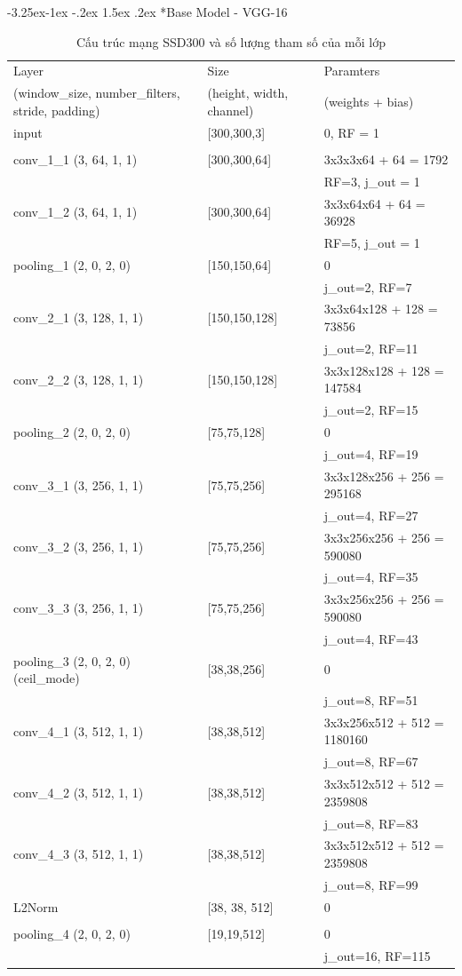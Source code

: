 \documentclass[a4paper]{report}
\makeatletter
\newcounter {subsubsubsection}[subsubsection]
\newcommand\subsubsubsection{\@startsection{subsubsubsection}{4}{\z@}%
                                     {-3.25ex\@plus -1ex \@minus -.2ex}%
                                     {1.5ex \@plus .2ex}%
                                     {\normalfont\normalsize\bfseries}}
\makeatother
\begin{document}
\subsubsubsection*{Base Model - VGG-16}
\begin{table}[h]
	\caption{Cấu trúc mạng SSD300 và số lượng tham số của mỗi lớp}
	\begin{tabular}{|l|l|l|}
		\hline
		Layer & Size & Paramters \\
		(window\_size, number\_filters, stride, padding) &
		(height, width, channel)& (weights + bias)\\ \hline

		input & [300,300,3] & 0, RF = 1 \\
		& & \\ \hline
		conv\_1\_1 (3, 64, 1, 1) & [300,300,64] & 3x3x3x64 + 64 = 1792\\  
		& & RF=3, j\_out = 1 \\ \hline
		conv\_1\_2 (3, 64, 1, 1) & [300,300,64] & 3x3x64x64 + 64 = 36928 \\
		& & RF=5, j\_out = 1 \\ \hline
		pooling\_1 (2, 0, 2, 0) & [150,150,64] & 0 \\
		&&j\_out=2, RF=7 \\ \hline
		conv\_2\_1 (3, 128, 1, 1) & [150,150,128] & 3x3x64x128 + 128 = 73856\\
		&&j\_out=2, RF=11 \\ \hline
		conv\_2\_2 (3, 128, 1, 1) & [150,150,128] & 3x3x128x128 + 128 = 147584\\
		&&j\_out=2, RF=15 \\ \hline
		pooling\_2 (2, 0, 2, 0) & [75,75,128] & 0\\
		&&j\_out=4, RF=19 \\ \hline
		conv\_3\_1 (3, 256, 1, 1) & [75,75,256] & 3x3x128x256 + 256 = 295168\\
		&&j\_out=4, RF=27 \\ \hline
		conv\_3\_2 (3, 256, 1, 1) & [75,75,256] & 3x3x256x256 + 256 = 590080\\
		&&j\_out=4, RF=35 \\ \hline
		conv\_3\_3 (3, 256, 1, 1) & [75,75,256] & 3x3x256x256 + 256 = 590080\\
		&&j\_out=4, RF=43 \\ \hline
		pooling\_3 (2, 0, 2, 0) (ceil\_mode) & [38,38,256] & 0\\
		&&j\_out=8, RF=51 \\ \hline
		conv\_4\_1 (3, 512, 1, 1) & [38,38,512] & 3x3x256x512 + 512 = 1180160\\
		&&j\_out=8, RF=67 \\ \hline
		conv\_4\_2 (3, 512, 1, 1) & [38,38,512] & 3x3x512x512 + 512 = 2359808\\
		&&j\_out=8, RF=83 \\ \hline
		conv\_4\_3 (3, 512, 1, 1) & [38,38,512] & 3x3x512x512 + 512 = 2359808\\
		&& j\_out=8, RF=99 \\ \hline
		L2Norm & [38, 38, 512] & 0 \\ 
		& & \\ \hline
		pooling\_4 (2, 0, 2, 0) & [19,19,512] &0\\
		&&j\_out=16, RF=115 \\ \hline



\end{tabular}
\end{table}
\end{document}
